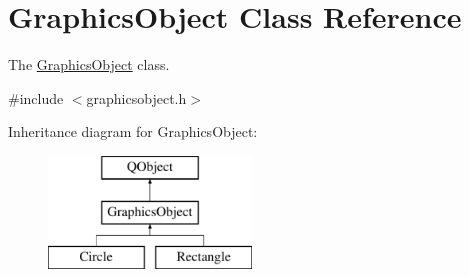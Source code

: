 \hypertarget{class_graphics_object}{}\section{Graphics\+Object Class Reference}
\label{class_graphics_object}


The \hyperlink{class_graphics_object}{Graphics\+Object} class.  




{\ttfamily \#include $<$graphicsobject.\+h$>$}

Inheritance diagram for Graphics\+Object\+:\begin{figure}[H]
\begin{center}
\leavevmode
\includegraphics[height=3.000000cm]{class_graphics_object}
\end{center}
\end{figure}
